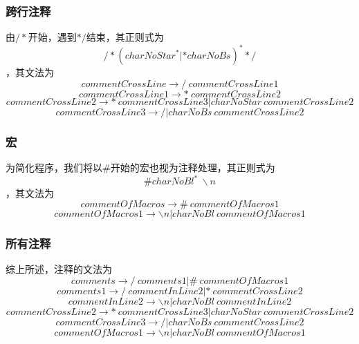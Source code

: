 \documentclass[UTF8]{ctexart}
\begin{document}
\subsubsection{跨行注释}
由$/*$开始，遇到$*/$结束，其正则式为
$$ /*({charNoStar}^*|*{charNoBs})^**/ $$
，其文法为
$$ commentCrossLine \rightarrow / \ commentCrossLine1 $$
$$ commentCrossLine1 \rightarrow * \ commentCrossLine2 $$
$$ commentCrossLine2 \rightarrow * \ commentCrossLine3 | charNoStar \ commentCrossLine2 $$
$$ commentCrossLine3 \rightarrow / | charNoBs \ commentCrossLine2 $$
\subsubsection{宏}
为简化程序，我们将以$\#$开始的宏也视为注释处理，其正则式为
$$ \# {charNoBl}^* \ \backslash n $$
，其文法为
$$ commentOfMacros \rightarrow \# \ commentOfMacros1 $$
$$ commentOfMacros1 \rightarrow \backslash n | charNoBl \ commentOfMacros1 $$
\subsubsection{所有注释}
综上所述，注释的文法为
$$ comments \rightarrow / \ comments1 | \# \ commentOfMacros1 $$
$$ comments1 \rightarrow / \ commentInLine2 |* \ commentCrossLine2  $$
$$ commentInLine2 \rightarrow \backslash n | charNoBl \ commentInLine2 $$
$$ commentCrossLine2 \rightarrow * \ commentCrossLine3 | charNoStar \ commentCrossLine2 $$
$$ commentCrossLine3 \rightarrow / | charNoBs \ commentCrossLine2 $$
$$ commentOfMacros1 \rightarrow \backslash n | charNoBl \ commentOfMacros1 $$
\end{document}
